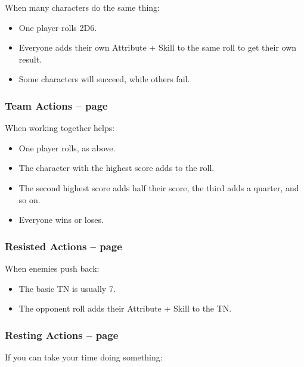 \begin{multicols}{2}
When many characters do the same thing:

\begin{itemize}

  \item
  One player rolls 2D6.
  \item
  Everyone adds their own Attribute + Skill to the same roll to get their own result.
  \item
  Some characters will succeed, while others fail.

\end{itemize}

\subsubsection{Team Actions -- page \pageref{teamwork}}

When working together helps:

\begin{itemize}

  \item
  One player rolls, as above.
  \item
  The character with the highest score adds to the roll.
  \item
  The second highest score adds half their score, the third adds a quarter, and so on.
  \item
  Everyone wins or loses.

\end{itemize}

\subsubsection{Resisted Actions -- page \pageref{resistedactions}}

When enemies push back:

\begin{itemize}

  \item{The basic TN is usually 7.}
  \item{The opponent roll adds their Attribute + Skill to the TN.}

\end{itemize}

\subsubsection{Resting Actions -- page \pageref{restingactions}}

If you can take your time doing something:


\end{multicols}
